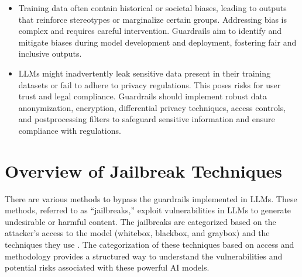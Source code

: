 \documentclass[letterpaper,11pt,english]{sphinxmanual}
\begin{document}
\begin{itemize}
\item {} 
\sphinxAtStartPar
{}

\sphinxAtStartPar
Training data often contain historical or societal biases, leading to
outputs that reinforce stereotypes or marginalize certain groups.
Addressing bias is complex and requires careful intervention.
Guardrails aim to identify and mitigate biases during model
development and deployment, fostering fair and inclusive outputs.

\item {} 
\sphinxAtStartPar
{}

\sphinxAtStartPar
LLMs might inadvertently leak sensitive data present in their training
datasets or fail to adhere to privacy regulations. This poses risks
for user trust and legal compliance. Guardrails should implement
robust data anonymization, encryption, differential privacy
techniques, access controls, and post\sphinxhyphen{}processing filters to safeguard
sensitive information and ensure compliance with regulations.

\end{itemize}


\section{Overview of Jailbreak Techniques}
\label{\detokenize{guardrails:overview-of-jailbreak-techniques}}
\sphinxAtStartPar
There are various methods to bypass the guardrails implemented in LLMs.
These methods, referred to as “jailbreaks,” exploit vulnerabilities in
LLMs to generate undesirable or harmful content. The jailbreaks are
categorized based on the attacker’s access to the model (white\sphinxhyphen{}box,
black\sphinxhyphen{}box, and gray\sphinxhyphen{}box) and the techniques they use . The categorization of
these techniques based on access and methodology provides a structured
way to understand the vulnerabilities and potential risks associated
with these powerful AI models.
\end{document}
